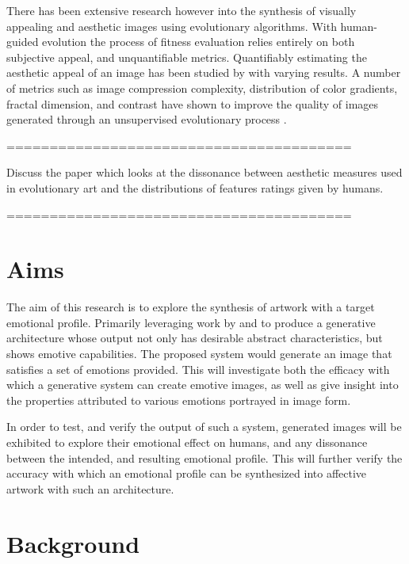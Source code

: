 \documentclass{article}
\begin{document}
	There has been extensive research however into the synthesis of visually appealing and aesthetic images using evolutionary algorithms.
	With human-guided evolution \citep{nevar} the process of fitness evaluation relies entirely on both subjective appeal, and unquantifiable metrics.
	Quantifiably estimating the aesthetic appeal of an image has been studied by \citet{den2010comparing, den2010using, den2011evolving} with varying results.
	A number of metrics such as image compression complexity, distribution of color gradients, fractal dimension, and contrast have shown to improve the quality of images generated through an unsupervised evolutionary process \citep{den2014investigating}.
	
	========================================
	
	Discuss the paper \citet{johnson2019understanding} which looks at the dissonance between aesthetic measures used in evolutionary art and the distributions of features ratings given by humans.
	
	========================================
	
	\section{Aims}
	
	The aim of this research is to explore the synthesis of artwork with a target emotional profile.
	Primarily leveraging work by \citet{tan2017artgan} and \citet{kim2018building} to produce a generative architecture whose output not only has desirable abstract characteristics, but shows emotive capabilities.
	The proposed system would generate an image that satisfies a set of emotions provided.
	This will investigate both the efficacy with which a generative system can create emotive images, as well as give insight into the properties attributed to various emotions portrayed in image form.
	
	In order to test, and verify the output of such a system, generated images will be exhibited to explore their emotional effect on humans, and any dissonance between the intended, and resulting emotional profile.
	This will further verify the accuracy with which an emotional profile can be synthesized into affective artwork with such an architecture.
	
	\section{Background}
	
\end{document}
